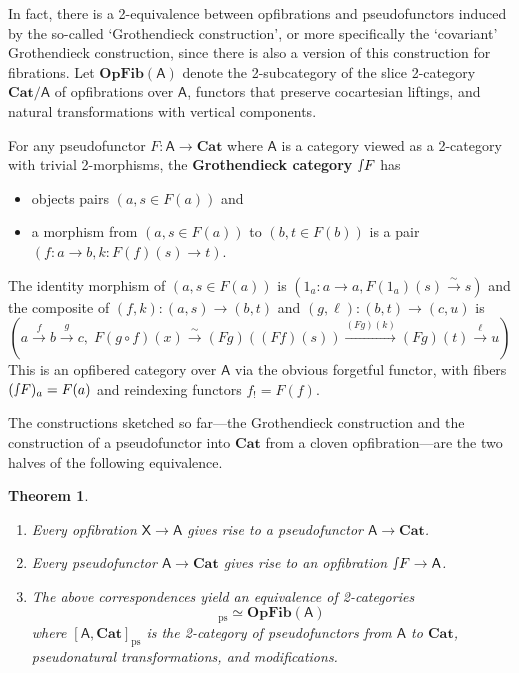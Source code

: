 \documentclass[ a4paper, onecolumn, superscriptaddress,10pt, accepted=2022-02-14, issue=3, volume=4, shorttitle=papers/compositionality-4-3 ]{compositionalityarticle}
\let\maps\colon
\newtheorem{thm}{Theorem}[section]
\newcommand{\A}{\mathsf{A}}
\newcommand{\X}{\mathsf{X}}
\newcommand{\bicat}{\mathbf}
\newcommand{\Cat}{\bicat{Cat}}
\newcommand{\OpFib}{\bicat{OpFib}}
\newcommand{\inta}{\raisebox{.3\depth}{$\smallint\hspace{-.01in}$}}
\newcommand{\pse}{\mathrm{ps}}
\begin{document}
In fact, there is a 2-equivalence between opfibrations and pseudofunctors induced by the so-called `Grothendieck construction', or more specifically the `covariant'  Grothendieck construction, since there is also a version of this construction for fibrations.  Let $\OpFib(\A)$ denote the 2-subcategory of the slice 2-category $\Cat/ \A$ of opfibrations over $\A$, functors that
preserve cocartesian liftings, and natural transformations with vertical components.
\begin{defn}\label{def:GrothCat}
For any pseudofunctor $F\maps\A\to\Cat$ where $\A$ is a category viewed as a 2-category with trivial 2-morphisms, the \textbf{Grothendieck category}
$\inta F$ has
\begin{itemize}
\item objects pairs $(a, s \in F(a))$ and
\item a morphism from $(a, s \in F(a))$ to $(b, t\in F(b))$ is a pair $(f \maps a \to b,k \maps F(f)(s) \to t)$.
\end{itemize}
The identity morphism of $(a, s\in F(a))$ is $(1_a\maps a\to a,F(1_a)(s)\xrightarrow{\sim} s)$ and the composite of $(f,k) \maps (a,s) \to (b,t)$ and $(g,\ell) \maps (b,t) \to (c,u)$ is
\[
\left(a\xrightarrow{f}b\xrightarrow{g}c, \; F(g\circ f)(x)\xrightarrow{\sim} (Fg)((Ff)(s))\xrightarrow{(Fg)(k)}(Fg)(t)\xrightarrow{\ell}u\right)
\]
This is an opfibered category over $\A$ via the obvious forgetful functor, with fibers $(\inta F)_a=F(a)$ and reindexing functors $f_!=F(f)$.
\end{defn}
The constructions sketched so far---the Grothendieck construction and the construction of a pseudofunctor into $\Cat$ from a cloven opfibration---are the two halves of the following equivalence.

\begin{thm}\label{thm:Grothendieck}\hfill
\begin{enumerate}
\item Every opfibration $\X \to \A$ gives rise to a pseudofunctor $\A \to \Cat$.
\item Every pseudofunctor $\A \to \Cat$ gives rise to an opfibration $\inta F \to\A$.
\item The above correspondences yield an equivalence of 2-categories
\begin{displaymath}
[\A,\Cat]_\pse \simeq \OpFib(\A)
\end{displaymath}
where $[\A,\Cat]_\pse$ is the 2-category of pseudofunctors from $\A$ to $\Cat$, pseudonatural transformations, and modifications.
\end{enumerate}
\end{thm}
\end{document}

